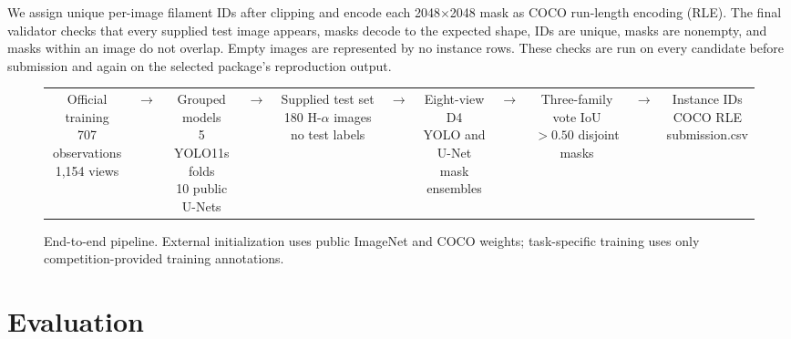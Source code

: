 \documentclass[sigconf]{acmart}
\begin{document}
We assign unique per-image filament IDs after clipping and encode each 2048$\times$2048 mask as COCO run-length encoding (RLE). The final validator checks that every supplied test image appears, masks decode to the expected shape, IDs are unique, masks are nonempty, and masks within an image do not overlap. Empty images are represented by no instance rows. These checks are run on every candidate before submission and again on the selected package's reproduction output.

\begin{figure}[t]
\centering
\setlength{\tabcolsep}{2pt}
\begin{tabular}{c c c c c c c c c c c}
\fbox{\parbox[c][0.72in][c]{0.118\textwidth}{\centering\scriptsize Official training\\707 observations\\1,154 views}} & $\longrightarrow$ &
\fbox{\parbox[c][0.72in][c]{0.118\textwidth}{\centering\scriptsize Grouped models\\5 YOLO11s folds\\10 public U-Nets}} & $\longrightarrow$ &
\fbox{\parbox[c][0.72in][c]{0.118\textwidth}{\centering\scriptsize Supplied test set\\180 H-$\alpha$ images\\no test labels}} & $\longrightarrow$ &
\fbox{\parbox[c][0.72in][c]{0.118\textwidth}{\centering\scriptsize Eight-view D4\\YOLO and U-Net\\mask ensembles}} & $\longrightarrow$ &
\fbox{\parbox[c][0.72in][c]{0.118\textwidth}{\centering\scriptsize Three-family vote\\IoU $>0.50$\\disjoint masks}} & $\longrightarrow$ &
\fbox{\parbox[c][0.72in][c]{0.118\textwidth}{\centering\scriptsize Instance IDs\\COCO RLE\\submission.csv}}
\end{tabular}
\caption{End-to-end pipeline. External initialization uses public ImageNet and COCO weights; task-specific training uses only competition-provided training annotations.}
\label{fig:pipeline}
\end{figure}

\section{Evaluation}\label{sec:evaluation}
\end{document}
